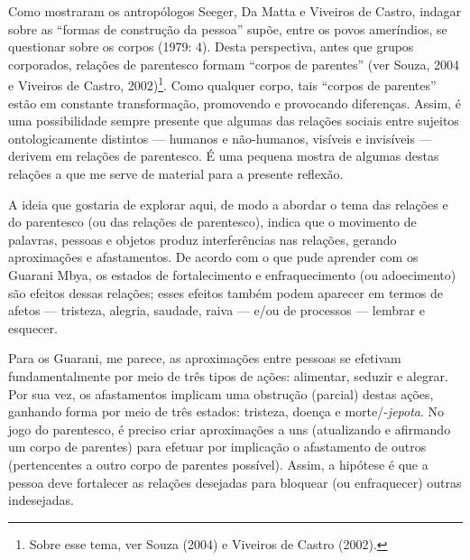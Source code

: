 Como mostraram os antropólogos Seeger, Da Matta e Viveiros de Castro,
indagar sobre as ``formas de construção da pessoa'' supõe, entre os
povos ameríndios, se questionar sobre os corpos (1979: 4). Desta
perspectiva, antes que grupos corporados, relações de parentesco formam
``corpos de parentes'' (ver Souza, 2004 e Viveiros de Castro,
2002)\footnote{Sobre esse tema, ver Souza (2004) e Viveiros de Castro
  (2002).}. Como qualquer corpo, tais ``corpos de parentes'' estão em
constante transformação, promovendo e provocando diferenças. Assim, é
uma possibilidade sempre presente que algumas das relações sociais entre
sujeitos ontologicamente distintos --- humanos e não-humanos, visíveis e
invisíveis --- derivem em relações de parentesco. É uma pequena mostra
de algumas destas relações a que me serve de material para a presente
reflexão.

A ideia que gostaria de explorar aqui, de modo a abordar o tema das
relações e do parentesco (ou das relações de parentesco), indica que o
movimento de palavras, pessoas e objetos produz interferências nas
relações, gerando aproximações e afastamentos. De acordo com o que pude
aprender com os Guarani Mbya, os estados de fortalecimento e
enfraquecimento (ou adoecimento) são efeitos dessas relações; esses
efeitos também podem aparecer em termos de afetos --- tristeza, alegria,
saudade, raiva --- e/ou de processos --- lembrar e esquecer.

Para os Guarani, me parece, as aproximações entre pessoas se efetivam
fundamentalmente por meio de três tipos de ações: alimentar, seduzir e
alegrar. Por sua vez, os afastamentos implicam uma obstrução (parcial)
destas ações, ganhando forma por meio de três estados: tristeza, doença
e morte/-\emph{jepota}. No jogo do parentesco, é preciso criar
aproximações a uns (atualizando e afirmando um corpo de parentes) para
efetuar por implicação o afastamento de outros (pertencentes a outro
corpo de parentes possível). Assim, a hipótese é que a pessoa deve
fortalecer as relações desejadas para bloquear (ou enfraquecer) outras
indesejadas.


